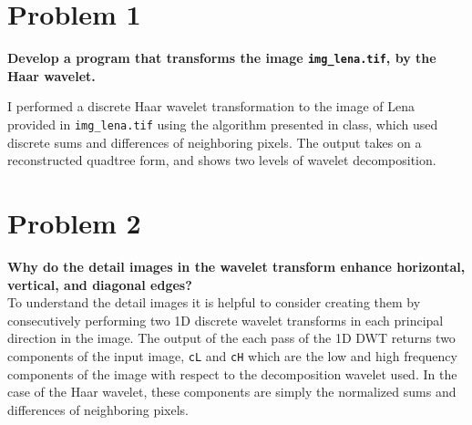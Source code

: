 \documentclass[aps,letterpaper,10pt]{article}
\newcommand{\ttt}{\texttt}
\begin{document}
\section{Problem 1}
\textbf{Develop a program that transforms the image \ttt{img\_lena.tif}, by the Haar wavelet.}\\
\begin{figure}[!h]
 \hspace{30px}
\caption{}
\label{fig:10-1}
\end{figure}

I performed a discrete Haar wavelet transformation to the image of Lena provided in \ttt{img\_lena.tif} using the algorithm presented in class, which used discrete sums and differences of neighboring pixels. The output takes on a reconstructed quadtree form, and shows two levels of wavelet decomposition.



\section{Problem 2}
\textbf{Why do the detail images in the wavelet transform enhance horizontal, vertical, and diagonal edges?}\\
To understand the detail images it is helpful to consider creating them by consecutively performing two 1D discrete wavelet transforms in each principal direction in the image. The output of the each pass of the 1D DWT returns two components of the input image, \ttt{cL} and \ttt{cH} which are the low and high frequency components of the image with respect to the decomposition wavelet used. In the case of the Haar wavelet, these components are simply the normalized sums and differences of neighboring pixels.
\end{document}

